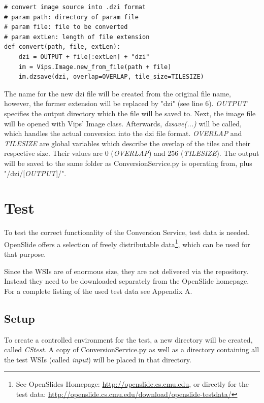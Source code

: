 \begin{lstlisting}[frame=single]
# convert image source into .dzi format
# param path: directory of param file
# param file: file to be converted
# param extLen: length of file extension
def convert(path, file, extLen):
	dzi = OUTPUT + file[:extLen] + "dzi"
	im = Vips.Image.new_from_file(path + file)
	im.dzsave(dzi, overlap=OVERLAP, tile_size=TILESIZE)
\end{lstlisting}

The name for the new dzi file will be created from the original file name, however, the former extension will be replaced by "dzi" (see line 6). \emph{OUTPUT} specifies the output directory which the file will be saved to. Next, the image file will be opened with Vips' Image class. Afterwards, \emph{dzsave(...)} will be called, which handles the actual conversion into the dzi file format. \emph{OVERLAP} and \emph{TILESIZE} are global variables which describe the overlap of the tiles and their respective size. Their values are 0 (\emph{OVERLAP}) and 256 (\emph{TILESIZE}). The output will be saved to the same folder as ConversionService.py is operating from, plus "/dzi/[\emph{OUTPUT}]/".


\section{Test}

To test the correct functionality of the Conversion Service, test data is needed. OpenSlide offers a selection of freely distributable data\footnote{See OpenSlides Homepage: \url{http://openslide.cs.cmu.edu}, or directly for the test data: \url{http://openslide.cs.cmu.edu/download/openslide-testdata/}}, which can be used for that purpose.

Since the WSIs are of enormous size, they are not delivered via the repository. Instead they need to be downloaded separately from the OpenSlide homepage. For a complete listing of the used test data see Appendix A.


\subsection{Setup}

To create a controlled environment for the test, a new directory will be created, called \emph{CS{\textunderscore}test}. A copy of ConversionService.py as well as a directory containing all the test WSIs (called \emph{input}) will be placed in that directory.

